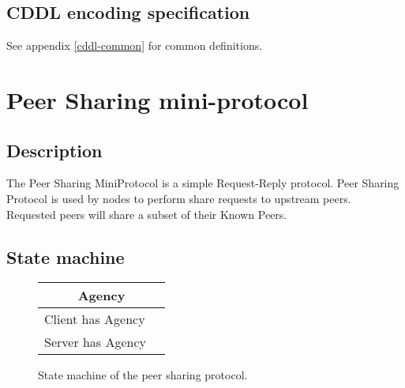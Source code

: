 \subsection{CDDL encoding specification}

See appendix \ref{cddl-common} for common definitions.

\section{Peer Sharing mini-protocol}
\label{peer-sharing-protocol}
\subsection{Description}
The Peer Sharing MiniProtocol is a simple Request-Reply protocol. Peer Sharing
Protocol is used by nodes to perform share requests to upstream peers. Requested peers
will share a subset of their Known Peers.

\newcommand{\PsClient}{\state{StIdle}}
\newcommand{\PsServer}{\state{StBusy}}
\newcommand{\MsgShareRequest}{\trans{MsgShareRequest}}
\newcommand{\MsgSharePeers}{\trans{MsgSharePeers}}
\subsection{State machine}

\begin{figure}[h]
  \begin{tabular}{|l|l|}
    \hline
    \multicolumn{2}{|c|}{Agency} \\ \hline
    Client has Agency & \PsClient  \\ \hline
    Server has Agency & \PsServer  \\ \hline
  \end{tabular}
\end{figure}

\begin{figure}[h]
  \caption{State machine of the peer sharing protocol.}
\end{figure}

